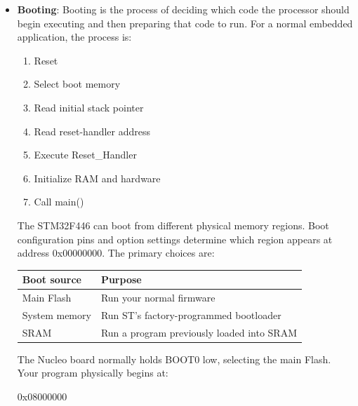 \documentclass{report}
\begin{document}
\begin{itemize}
\begin{itemize}
                \item Ordinary SRAM contents should be considered undefined, even if some electrical values happen to remain.
            \end{itemize}
        \item \textbf{Booting}: Booting is the process of deciding which code the processor should begin executing and then preparing that code to run.
            \bigbreak \noindent 
            For a normal embedded application, the process is:
            \begin{enumerate}
                \item Reset
                \item Select boot memory
                \item Read initial stack pointer
                \item Read reset-handler address
                \item Execute Reset\_Handler
                \item Initialize RAM and hardware
                \item Call main()
            \end{enumerate}
            The STM32F446 can boot from different physical memory regions. Boot configuration pins and option settings determine which region appears at address 0x00000000.
            \bigbreak \noindent 
            The primary choices are:
            \begin{center}
                \begin{tabularx}{\textwidth}{@{}XX@{}}
                    \toprule
                    \textbf{Boot source}&	\textbf{Purpose} \\
                    \midrule
                    Main Flash	& Run your normal firmware\\[2ex]
                    System memory&	Run ST’s factory-programmed bootloader\\[2ex]
                    SRAM	&Run a program previously loaded into SRAM \\
                    \bottomrule
                \end{tabularx}
            \end{center}
            The Nucleo board normally holds BOOT0 low, selecting the main Flash. 
            \bigbreak \noindent 
            Your program physically begins at:
            \bigbreak \noindent 
            \begin{bashcode}
            0x08000000
            \end{bashcode}

\end{itemize}
\end{document}
